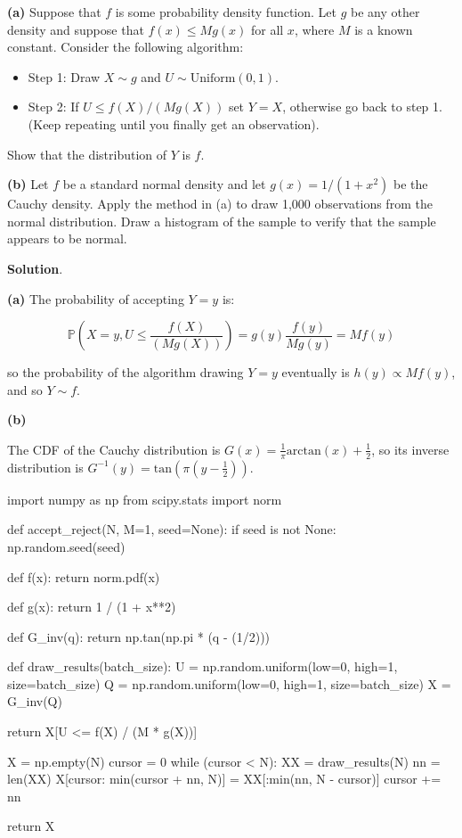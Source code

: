 \textbf{(a)} Suppose that \(f\) is some probability density function.
Let \(g\) be any other density and suppose that \(f(x) \leq M g(x)\) for
all \(x\), where \(M\) is a known constant. Consider the following
algorithm:

\begin{itemize}[tightlist]
\item
  Step 1: Draw \(X \sim g\) and \(U \sim \text{Uniform}(0, 1)\).
\item
  Step 2: If \(U \leq f(X) / (M g(X))\) set \(Y = X\), otherwise go back
  to step 1. (Keep repeating until you finally get an observation).
\end{itemize}

Show that the distribution of \(Y\) is \(f\).

\textbf{(b)} Let \(f\) be a standard normal density and let
\(g(x) = 1 / (1 + x^2)\) be the Cauchy density. Apply the method in (a)
to draw 1,000 observations from the normal distribution. Draw a
histogram of the sample to verify that the sample appears to be normal.

\textbf{Solution}.

\textbf{(a)} The probability of accepting \(Y = y\) is:

\[ \mathbb{P}\left(X = y, U \leq \frac{f(X)}{(M g(X))} \right) = g(y) \frac{f(y)}{M g(y)} = M f(y) \]

so the probability of the algorithm drawing \(Y = y\) eventually is
\(h(y) \propto M f(y)\), and so \(Y \sim f\).

\textbf{(b)}

The CDF of the Cauchy distribution is
\(G(x) = \frac{1}{\pi} \text{arctan}\left( x \right) + \frac{1}{2}\), so
its inverse distribution is
\(G^{-1}(y) = \text{tan} \left( \pi \left( y - \frac{1}{2} \right) \right)\).

\begin{python}
import numpy as np
from scipy.stats import norm

def accept_reject(N, M=1, seed=None):
    if seed is not None:
        np.random.seed(seed)
        
    def f(x):
        return norm.pdf(x)

    def g(x):
        return 1 / (1 + x**2)
    
    def G_inv(q):
        return np.tan(np.pi * (q - (1/2)))
        
    def draw_results(batch_size): 
        U = np.random.uniform(low=0, high=1, size=batch_size)
        Q = np.random.uniform(low=0, high=1, size=batch_size)
        X = G_inv(Q)

        return X[U <= f(X) / (M * g(X))]
    
    X = np.empty(N)
    cursor = 0
    while (cursor < N):
        XX = draw_results(N)
        nn = len(XX)
        X[cursor: min(cursor + nn, N)] = XX[:min(nn, N - cursor)]
        cursor += nn
    
    return X
\end{python}

